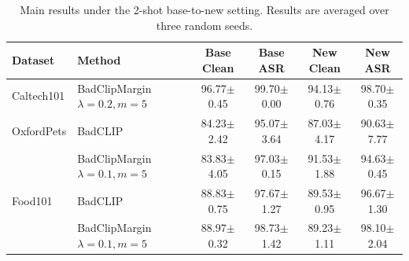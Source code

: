 \begin{table}[t]
\centering
\caption{Main results under the 2-shot base-to-new setting. Results are averaged over three random seeds.}
\label{tab:main_results_mean_std}
\begin{tabular}{llcccc}
\toprule
Dataset & Method & Base Clean & Base ASR & New Clean & New ASR \\
\midrule
Caltech101 & BadClipMargin $\lambda=0.2,m=5$ & 96.77$\pm$0.45 & 99.70$\pm$0.00 & 94.13$\pm$0.76 & 98.70$\pm$0.35 \\
\midrule
OxfordPets & BadCLIP & 84.23$\pm$2.42 & 95.07$\pm$3.64 & 87.03$\pm$4.17 & 90.63$\pm$7.77 \\
 & BadClipMargin $\lambda=0.1,m=5$ & 83.83$\pm$4.05 & 97.03$\pm$0.15 & 91.53$\pm$1.88 & 94.63$\pm$0.45 \\
\midrule
Food101 & BadCLIP & 88.83$\pm$0.75 & 97.67$\pm$1.27 & 89.53$\pm$0.95 & 96.67$\pm$1.30 \\
 & BadClipMargin $\lambda=0.1,m=5$ & 88.97$\pm$0.32 & 98.73$\pm$1.42 & 89.23$\pm$1.11 & 98.10$\pm$2.04 \\
\bottomrule
\end{tabular}
\end{table}